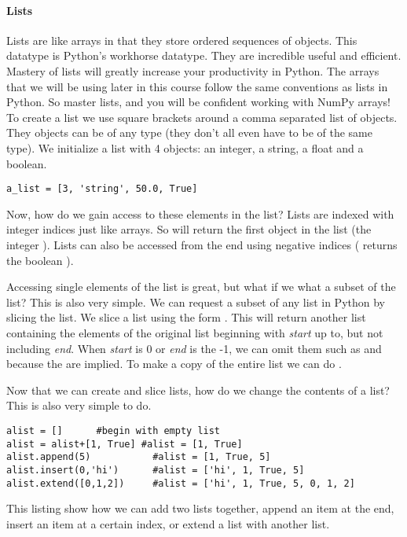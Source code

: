 \paragraph{Lists}
Lists are like arrays in that they store ordered sequences of objects.  This datatype is Python's workhorse datatype.  They are incredible useful and efficient.  Mastery of lists will greatly increase your productivity in Python.  The arrays that we will be using later in this course follow the same conventions as lists in Python.  So master lists, and you will be confident working with NumPy arrays!  To create a list we use square brackets around a comma separated list of objects.  They objects can be of any type (they don't all even have to be of the same type).  We initialize a list with 4 objects: an integer, a string, a float and a boolean.
\begin{lstlisting}[style=python]
a_list = [3, 'string', 50.0, True]
\end{lstlisting}
Now, how do we gain access to these elements in the list?  Lists are indexed with integer indices just like arrays. So  will return the first object in the list (the integer ).  Lists can also be accessed from the end using negative indices ( returns the boolean ).

Accessing single elements of the list is great, but what if we what a subset of the list?  This is also very simple.  We can request a subset of any list in Python by slicing the list.  We slice a list using the form .  This will return another list containing the elements of the original list beginning with \emph{start} up to, but not including \emph{end}.  When \emph{start} is 0 or \emph{end} is the -1, we can omit them such as  and  because the are implied.  To make a copy of the entire list we can do .

Now that we can create and slice lists, how do we change the contents of a list?  This is also very simple to do.
\begin{lstlisting}[style=python]
alist = []      #begin with empty list
alist = alist+[1, True] #alist = [1, True]
alist.append(5)           #alist = [1, True, 5]
alist.insert(0,'hi')      #alist = ['hi', 1, True, 5]
alist.extend([0,1,2])     #alist = ['hi', 1, True, 5, 0, 1, 2]
\end{lstlisting}
This listing show how we can add two lists together, append an item at the end, insert an item at a certain index, or extend a list with another list.

